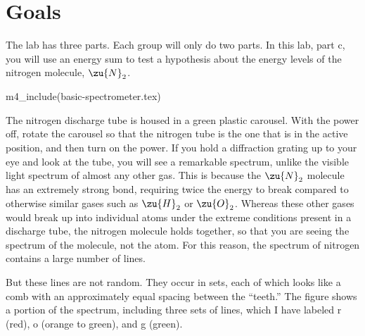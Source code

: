 \addtocounter{chapter}{-1}
\renewcommand\thechapter{\arabic{chapter}c}
\label{lab:nitrogen}
\renewcommand\thechapter{\arabic{chapter}}

\apparatus
{}

\section*{Goals}

The lab has three parts. Each group will only do two parts.
In this lab, part c, you will use an energy sum to test a hypothesis about the energy levels of the nitrogen molecule, $\zu{N}_2$.

m4_include(basic-spectrometer.tex)

The nitrogen discharge tube is housed in a green plastic
carousel. With the power off, rotate the carousel so that the nitrogen tube is
the one that is in the active position, and then turn on the power.
If you hold a diffraction grating up to your eye and look at the
tube, you will see a remarkable spectrum, unlike the visible light
spectrum of almost any other gas. This is because the $\zu{N}_2$ molecule has
an extremely strong bond, requiring twice the energy to break compared to
otherwise similar gases such as $\zu{H}_2$ or $\zu{O}_2$.
Whereas these other gases would break up into individual atoms under the extreme
conditions present in a discharge tube, the nitrogen molecule holds together, so
that you are seeing the spectrum of the molecule, not the atom.
For this reason, the spectrum of nitrogen contains a large number of lines.


But these lines are not random. They occur in sets, each of which looks like
a comb with an approximately equal spacing between the ``teeth.'' The figure
shows a portion of the spectrum, including three sets of lines, which I have
labeled r (red), o (orange to green), and g (green).

